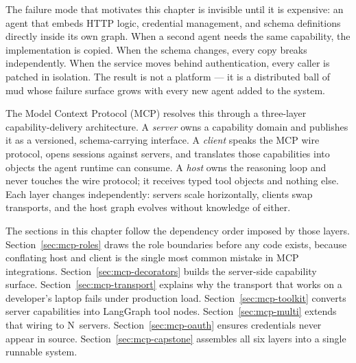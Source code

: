


The failure mode that motivates this chapter is invisible until it is
expensive: an agent that embeds HTTP logic, credential management, and
schema definitions directly inside its own graph.
When a second agent needs the same capability, the implementation is
copied. When the schema changes, every copy breaks independently.
When the service moves behind authentication, every caller is patched
in isolation. The result is not a platform --- it is a distributed ball
of mud whose failure surface grows with every new agent added to the
system.

The Model Context Protocol (MCP) resolves this through a three-layer
capability-delivery architecture. A \emph{server} owns a capability
domain and publishes it as a versioned, schema-carrying interface.
A \emph{client} speaks the MCP wire protocol, opens sessions against
servers, and translates those capabilities into objects the agent runtime
can consume. A \emph{host} owns the reasoning loop and never touches the
wire protocol; it receives typed tool objects and nothing else.
Each layer changes independently: servers scale horizontally, clients
swap transports, and the host graph evolves without knowledge of either.

The sections in this chapter follow the dependency order imposed by those
layers. Section~\ref{sec:mcp-roles} draws the role boundaries before any
code exists, because conflating host and client is the single most common
mistake in MCP integrations. Section~\ref{sec:mcp-decorators} builds the
server-side capability surface. Section~\ref{sec:mcp-transport} explains
why the transport that works on a developer's laptop fails under production
load. Section~\ref{sec:mcp-toolkit} converts server capabilities into
LangGraph tool nodes. Section~\ref{sec:mcp-multi} extends that wiring to
N~servers. Section~\ref{sec:mcp-oauth} ensures credentials never appear
in source. Section~\ref{sec:mcp-capstone} assembles all six layers into a
single runnable system.

